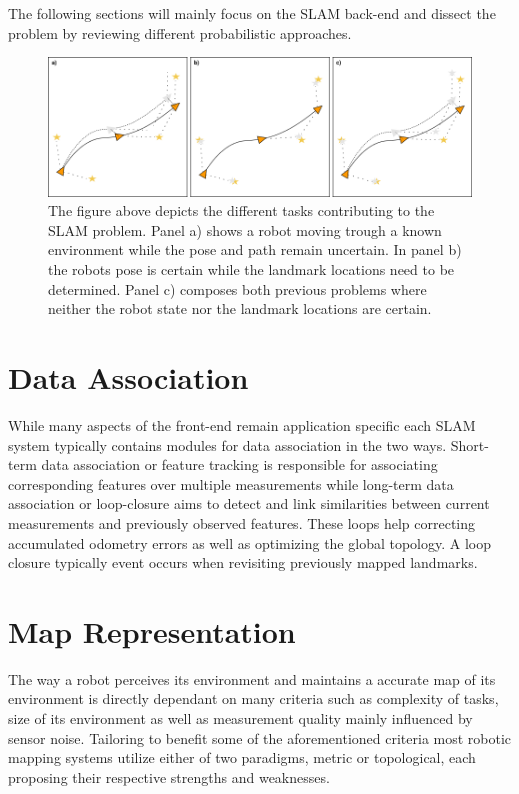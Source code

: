 The following sections will mainly focus on the SLAM back-end and dissect the problem by reviewing different probabilistic approaches. 




\begin{figure}
	\centering
	\includegraphics[width=1.0\linewidth]{img/slamOverview}
	\caption{
		The figure above depicts the different tasks contributing to the SLAM problem. Panel a) shows a robot moving trough a known environment while the pose and path remain uncertain. In panel b) the robots pose is certain while the landmark locations need to be determined. Panel c) composes both previous problems where neither the robot state nor the landmark locations are certain.
	}
	\label{fig:slamOverview}
\end{figure}


\section{Data Association}
While many aspects of the front-end remain application specific each SLAM system typically contains modules for data association in the two ways.
Short-term data association or feature tracking is responsible for associating corresponding features over multiple measurements while long-term data association or loop-closure aims to detect and link similarities between current measurements and previously observed features. These loops help correcting accumulated odometry errors as well as optimizing the global topology. 
A loop closure typically event occurs when revisiting previously mapped landmarks.

\section{Map Representation}
The way a robot perceives its environment and maintains a accurate map of its environment is directly dependant on many criteria such as complexity of tasks, size of its environment as well as measurement quality mainly influenced by sensor noise. 
Tailoring to benefit some of the aforementioned criteria most robotic mapping systems utilize either of two paradigms, metric or topological, each proposing their respective strengths and weaknesses.

